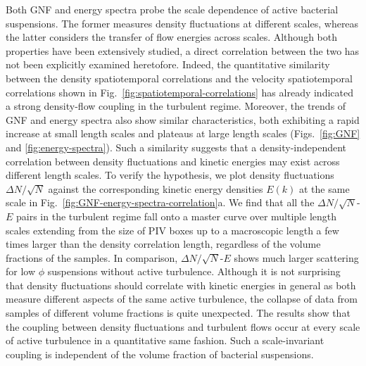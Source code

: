 \documentclass[twocolumn,aps,prx,amsmath,amssymb,longbibliography]{revtex4-2}
\begin{document}
Both GNF and energy spectra probe the scale dependence of active bacterial suspensions. The former measures density fluctuations at different scales, whereas the latter considers the transfer of flow energies across scales. Although both properties have been extensively studied, a direct correlation between the two has not been explicitly examined heretofore. Indeed, the quantitative similarity between the density spatiotemporal correlations and the velocity spatiotemporal correlations shown in Fig.~\ref{fig:spatiotemporal-correlations} has already indicated a strong density-flow coupling in the turbulent regime. Moreover, the trends of GNF and energy spectra also show similar characteristics, both exhibiting a rapid increase at small length scales and plateaus at large length scales (Figs.~\ref{fig:GNF} and \ref{fig:energy-spectra}). Such a similarity suggests that a density-independent correlation between density fluctuations and kinetic energies may exist across different length scales. To verify the hypothesis, we plot density fluctuations $\Delta N/\sqrt N$ against the corresponding kinetic energy densities $E(k)$ at the same scale in Fig.~\ref{fig:GNF-energy-spectra-correlation}a. We find that all the $\Delta N/\sqrt N$-$E$ pairs in the turbulent regime fall onto a master curve over multiple length scales extending from the size of PIV boxes up to a macroscopic length a few times larger than the density correlation length, regardless of the volume fractions of the samples.
In comparison, $\Delta N/\sqrt N$-$E$ shows much larger scattering for low $\phi$ suspensions without active turbulence. Although it is not surprising that density fluctuations should correlate with kinetic energies in general as both measure different aspects of the same active turbulence, the collapse of data from samples of different volume fractions is quite unexpected.
The results show that the coupling between density fluctuations and turbulent flows occur at every scale of active turbulence in a quantitative same fashion. Such a scale-invariant coupling is independent of the volume fraction of bacterial suspensions.
\end{document}
